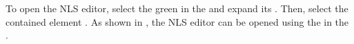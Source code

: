 %
To open the NLS editor, select the green  in the \scoutExplorerView and expand its .
Then, select the contained element .
As shown in , the NLS editor can be opened using the  in the \scoutPropView.
